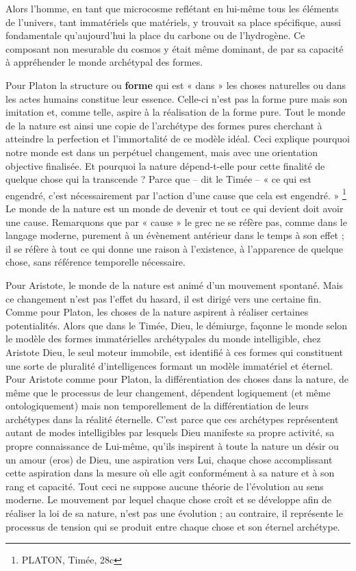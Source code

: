 \documentclass[a4paper,12pt]{article}
\begin{document}
Alors l'homme, en tant que microcosme reflétant en lui-même tous les éléments de l'univers, tant immatériels que matériels, y trouvait sa place spécifique, aussi fondamentale qu’aujourd'hui la place du carbone ou de l'hydrogène. Ce composant non mesurable du cosmos y était même dominant, de par sa capacité à appréhender le monde archétypal des formes. 

Pour Platon la structure ou  \textbf{forme} qui est « dans » les choses naturelles ou dans les actes humains constitue leur essence. Celle-ci n'est pas la forme pure mais son imitation et, comme telle, aspire à la réalisation de la forme pure. Tout le monde de la nature est ainsi une copie de l'archétype des formes pures cherchant à atteindre la perfection et l'immortalité de ce modèle idéal. Ceci explique pourquoi notre monde est dans un perpétuel changement, mais avec une orientation objective finalisée. Et pourquoi la nature dépend-t-elle pour cette finalité de quelque chose qui la transcende ? Parce que – dit le Timée – « ce qui est engendré, c'est nécessairement par l'action d'une cause que cela est engendré. » \footnote{PLATON, Timée, 28c} Le monde de la nature est un monde de devenir et tout ce qui devient doit avoir une cause. Remarquons que par « cause » le grec ne se réfère pas, comme dans le langage moderne, purement à un évènement antérieur dans le temps à son effet ; il se réfère à tout ce qui donne une raison à l'existence, à l'apparence de quelque chose, sans référence temporelle nécessaire. 

Pour Aristote, le monde de la nature est animé d'un mouvement spontané. Mais ce changement n'est pas l'effet du hasard, il est dirigé vers une certaine fin. Comme pour Platon, les choses de la nature aspirent à réaliser certaines potentialités. Alors que dans le Timée, Dieu, le démiurge, façonne le monde selon le modèle des formes immatérielles archétypales du monde intelligible, chez Aristote Dieu, le seul moteur immobile, est identifié à ces formes qui constituent une sorte de pluralité d'intelligences formant un modèle immatériel et éternel. Pour Aristote comme pour Platon, la différentiation des choses dans la nature, de même que le processus de leur changement, dépendent logiquement (et même ontologiquement) mais non temporellement de la différentiation de leurs archétypes dans la réalité éternelle. C'est parce que ces archétypes représentent autant de modes intelligibles par lesquels Dieu manifeste sa propre activité, sa propre connaissance de Lui-même, qu'ils inspirent à toute la nature un désir ou un amour (eros) de Dieu, une aspiration vers Lui, chaque chose accomplissant cette aspiration dans la mesure où elle agit conformément à sa nature et à son rang et capacité. Tout ceci ne suppose aucune théorie de l'évolution au sens moderne. Le mouvement par lequel chaque chose croît et se développe afin de réaliser la loi de sa nature, n'est pas une évolution ; au contraire, il représente le processus de tension qui se produit entre chaque chose et son éternel archétype. 
\end{document}

